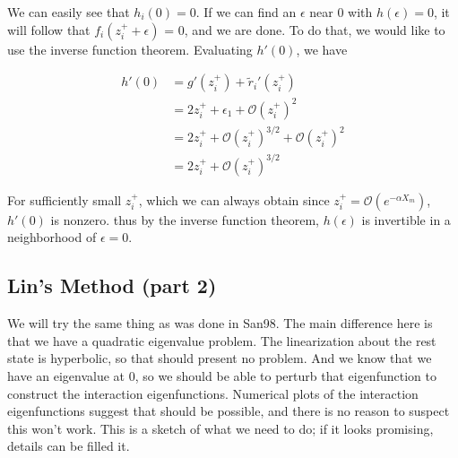 \documentclass[12pt]{article}
\begin{document}
We can easily see that $h_i(0) = 0$. If we can find an $\epsilon$ near 0 with $h(\epsilon) = 0$, it will follow that $f_i(z_i^+ + \epsilon)$ = 0, and we are done. To do that, we would like to use the inverse function theorem. Evaluating $h'(0)$, we have

\begin{align*}
h'(0) &= g'(z_i^+) + \tilde{r}_i'(z_i^+) \\
&= 2 z_i^+ + \epsilon_1 + \mathcal{O}(z_i^+)^2 \\
&= 2 z_i^+ + \mathcal{O}(z_i^+)^{3/2} + \mathcal{O}(z_i^+)^2 \\
&= 2 z_i^+ + \mathcal{O}(z_i^+)^{3/2} 
\end{align*}

For sufficiently small $z_i^+$, which we can always obtain since $z_i^+ = \mathcal{O}(e^{-\alpha X_m})$, $h'(0)$ is nonzero. thus by the inverse function theorem, $h(\epsilon)$ is invertible in a neighborhood of $\epsilon = 0$. 


\subsection{Lin's Method (part 2)}

We will try the same thing as was done in San98. The main difference here is that we have a quadratic eigenvalue problem. The linearization about the rest state is hyperbolic, so that should present no problem. And we know that we have an eigenvalue at 0, so we should be able to perturb that eigenfunction to construct the interaction eigenfunctions. Numerical plots of the interaction eigenfunctions suggest that should be possible, and there is no reason to suspect this won't work. This is a sketch of what we need to do; if it looks promising, details can be filled it.
\end{document}
